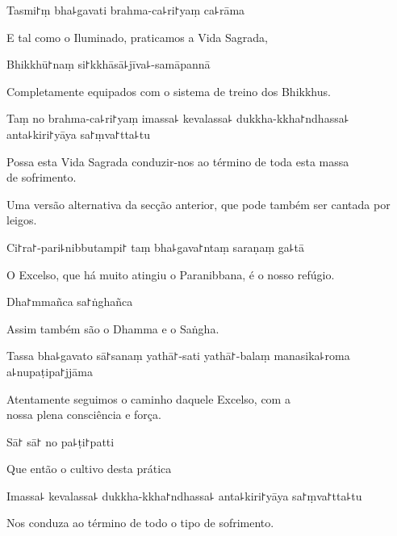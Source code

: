 Tasmi꜓ṃ bha꜕gavati brahma-ca꜕ri꜓yaṃ ca꜕rāma

\begin{english}
  E tal como o Iluminado, praticamos a Vida Sagrada, 
\end{english}

Bhikkhū꜓naṃ si꜓kkhāsā꜕jīva꜕-samāpannā

\begin{english}
  Completamente equipados com o sistema de treino dos Bhikkhus.
\end{english}

Taṃ no brahma-ca꜕ri꜓yaṃ imassa꜕ kevalassa꜕ dukkha-kkha꜓ndhassa꜕ anta꜕kiri꜓yāya sa꜓ṃva꜓tta꜕tu

\begin{english}
  Possa esta Vida Sagrada conduzir-nos ao término de toda esta massa\\  de sofrimento.
\end{english}

\begin{instruction}
  Uma versão alternativa da secção anterior, que pode também ser cantada por leigos.
\end{instruction}

Ci꜓ra꜓-pari꜕nibbutampi꜓ taṃ bha꜕gava꜓ntaṃ saraṇaṃ ga꜕tā

\begin{english}
  O Excelso, que há muito atingiu o Paranibbana, é o nosso refúgio.
\end{english}

Dha꜓mmañca sa꜓ṅghañca

\begin{english}
  Assim também são o Dhamma e o Saṅgha.
\end{english}

Tassa bha꜕gavato sā꜓sanaṃ yathā꜓-sati yathā꜓-balaṃ manasika꜕roma a꜕nupaṭipa꜓jjāma

\begin{english}
  Atentamente seguimos o caminho daquele Excelso, com  a \\nossa plena consciência e força.
\end{english}

Sā꜓ sā꜓ no pa꜕ṭi꜓patti

\begin{english}
  Que então o cultivo desta prática
\end{english}

Imassa꜕ kevalassa꜕ dukkha-kkha꜓ndhassa꜕ anta꜕kiri꜓yāya sa꜓ṃva꜓tta꜕tu

\begin{english}
  Nos conduza ao término de todo o tipo de sofrimento.
\end{english}

